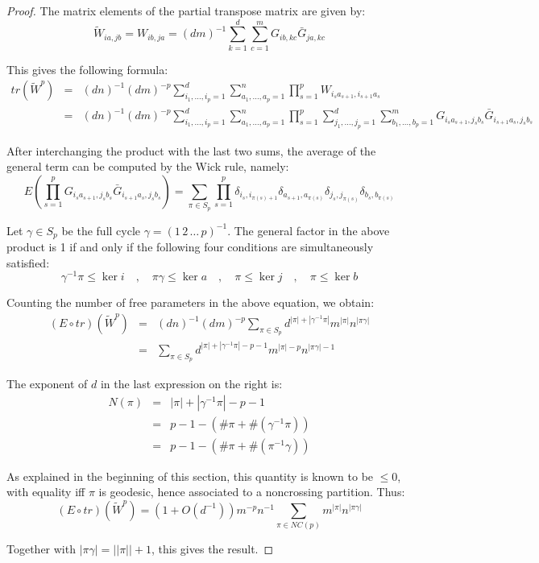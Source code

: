 \documentclass[12pt]{amsbook}
\begin{document}
\begin{proof}
The matrix elements of the partial transpose matrix are given by:
$$\widetilde{W}_{ia,jb}=W_{ib,ja}=(dm)^{-1}\sum_{k=1}^d\sum_{c=1}^mG_{ib,kc}\bar{G}_{ja,kc}$$

This gives the following formula:
\begin{eqnarray*}
tr(\widetilde{W}^p)
&=&(dn)^{-1}(dm)^{-p}\sum_{i_1,\ldots,i_p=1}^d\sum_{a_1,\ldots,a_p=1}^n\prod_{s=1}^p W_{i_sa_{s+1},i_{s+1}a_s} \\
&=&(dn)^{-1}(dm)^{-p}\sum_{i_1,\ldots,i_p=1}^d\sum_{a_1,\ldots,a_p=1}^n\prod_{s=1}^p \sum_{j_1,\ldots,j_p=1}^d\sum_{b_1,\ldots,b_p=1}^mG_{i_sa_{s+1},j_sb_s}\bar{G}_{i_{s+1}a_s,j_sb_s}
\end{eqnarray*}

After interchanging the product with the last two sums, the average of the general term can be computed by the Wick rule, namely:
$$E\left(\prod_{s=1}^pG_{i_sa_{s+1},j_sb_s}\bar{G}_{i_{s+1}a_s,j_sb_s}\right)
=\sum_{\pi\in S_p}\prod_{s=1}^p\delta_{i_s,i_{\pi(s)+1}}\delta_{a_{s+1},a_{\pi(s)}}\delta_{j_s,j_{\pi(s)}}\delta_{b_s,b_{\pi(s)}}$$

Let $\gamma\in S_p$ be the full cycle $\gamma=(1 \, 2 \, \ldots \, p)^{-1}$. The general factor in the above product is 1 if and only if the following four conditions are simultaneously satisfied:
$$\gamma^{-1}\pi\leq \ker i\quad,\quad
\pi\gamma \leq \ker a\quad,\quad
\pi \leq \ker j\quad,\quad
\pi \leq \ker b$$

Counting the number of free parameters in the above equation, we obtain:
\begin{eqnarray*}
(E\circ tr)(\widetilde{W}^p)
&=&(dn)^{-1}(dm)^{-p}\sum_{\pi\in S_p}d^{|\pi|+|\gamma^{-1}\pi|}m^{|\pi|}n^{|\pi\gamma|}\\
&=&\sum_{\pi\in S_p}d^{|\pi|+|\gamma^{-1}\pi|-p-1}m^{|\pi|-p}n^{|\pi\gamma|-1}
\end{eqnarray*}

The exponent of $d$ in the last expression on the right is:
\begin{eqnarray*}
N(\pi)
&=&|\pi|+|\gamma^{-1}\pi|-p-1\\
&=&p-1-(\#\pi+\#(\gamma^{-1}\pi))\\
&=&p-1-(\#\pi+\#(\pi^{-1}\gamma))
\end{eqnarray*}

As explained in the beginning of this section, this quantity is known to be $\leq 0$, with equality iff $\pi$ is geodesic, hence associated to a noncrossing partition. Thus:
$$(E\circ tr)(\widetilde{W}^p)=(1+O(d^{-1}))m^{-p}n^{-1}\sum_{\pi\in NC(p)}m^{|\pi|} n^{|\pi\gamma|}$$

Together with $|\pi\gamma|=||\pi||+1$, this gives the result.
\end{proof}
\end{document}
